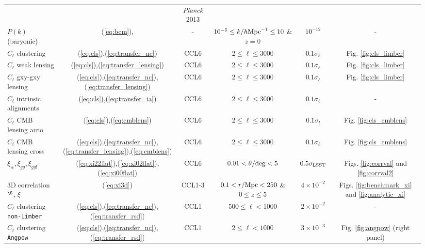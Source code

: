 \begin{sidewaystable*}[!htp]
\begin{tabular}{ l|c c c c c}
     &  & {\it Planck} 2013 &  & \\
    $P(k)$ (baryonic) & (\ref{eq:bcm}), \citet{Schneider15} &  - & $10^{-5}\leq k/h{\rm Mpc}^{-1}\leq 10$ \& $z=0$ & $10^{-12}$ & -\\
    $C_\ell$ clustering & (\ref{eq:cls}),(\ref{eq:transfer_nc})& CCL6 &$2 \leq \ell\leq 3000$ &  $0.1\sigma_\ell$  & Fig. \ref{fig:cls_limber}\\
    $C_\ell$ weak lensing & (\ref{eq:cls}),(\ref{eq:transfer_lensing})& CCL6 &$2 \leq \ell\leq 3000$ &  $0.1\sigma_\ell$  & Fig. \ref{fig:cls_limber}\\
    $C_\ell$ gxy-gxy lensing & (\ref{eq:cls}),(\ref{eq:transfer_nc}),(\ref{eq:transfer_lensing})& CCL6 &$2 \leq \ell\leq 3000$ &  $0.1\sigma_\ell$ & Fig. \ref{fig:cls_limber}\\
    $C_\ell$ intrinsic alignments & (\ref{eq:cls}),(\ref{eq:transfer_ia})& CCL6 &$2 \leq \ell\leq 3000$ &  $0.1\sigma_\ell$  & -\\
    $C_\ell$ CMB lensing auto &(\ref{eq:cls}),(\ref{eq:cmblens}) & CCL6 & $2 \leq \ell\leq 3000$& $0.1\sigma_l$  & Fig. \ref{fig:cls_cmblens}\\
    $C_\ell$ CMB lensing cross &(\ref{eq:cls}),(\ref{eq:transfer_nc}),(\ref{eq:transfer_lensing}),(\ref{eq:cmblens}) & CCL6 & $2 \leq \ell\leq 3000$& $0.1\sigma_\ell$  & Fig. \ref{fig:cls_cmblens}\\
    $\xi_{\pm},\xi_{gg},\xi_{ggl}$ & (\ref{eq:xi22flat}),(\ref{eq:xi02flat}),(\ref{eq:xi00flat}) & CCL6 & $0.01< \theta/{\rm deg}< 5$&  $0.5\sigma_{\rm LSST}$ & Figs. \ref{fig:corrval} and \ref{fig:corrval2}\\
    3D correlation$^\S$, $\xi$ & (\ref{eq:xi3d}) & CCL1-3 & $0.1<r/{\rm Mpc}<250$ \& $0 \leq z \leq 5$& $4\times 10^{-2}$ & Figs. \ref{fig:benchmark_xi} and \ref{fig:analytic_xi} \\
    $C_\ell$ clustering {\tt non-Limber} &  (\ref{eq:cls}),(\ref{eq:transfer_nc}),(\ref{eq:transfer_rsd}) & CCL1 & $500 \leq \ell < 1000$ & $2\times 10^{-2}$ & - \\
    $C_\ell$ clustering {\tt Angpow} & (\ref{eq:cls}),(\ref{eq:transfer_nc}),(\ref{eq:transfer_rsd}) & CCL1 & $2 \leq \ell < 1000$ & $3\times 10^{-3}$  & Fig. \ref{fig:angpow} (right panel)\\
    \hline
  \end{tabular}

\end{sidewaystable*}

